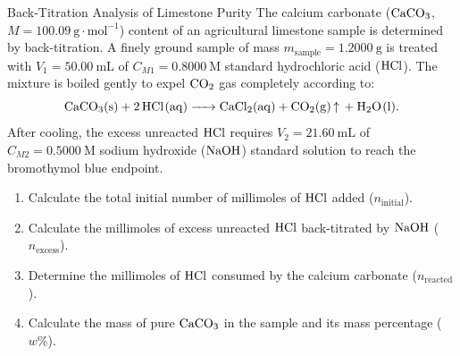 \begin{exercise}{Back-Titration Analysis of Limestone Purity}
The calcium carbonate ($\ce{CaCO3}$, $M = 100.09\ \mathrm{g\cdot mol^{-1}}$) content of an agricultural limestone sample is determined by back-titration. A finely ground sample of mass $m_{\text{sample}} = 1.2000\ \mathrm{g}$ is treated with $V_1 = 50.00\ \mathrm{mL}$ of $C_{M1} = 0.8000\ \mathrm{M}$ standard hydrochloric acid ($\ce{HCl}$). The mixture is boiled gently to expel $\ce{CO2}$ gas completely according to:
\[
\ce{CaCO3(s) + 2 HCl(aq) -> CaCl2(aq) + CO2(g) ^ + H2O(l)}.
\]
After cooling, the excess unreacted $\ce{HCl}$ requires $V_2 = 21.60\ \mathrm{mL}$ of $C_{M2} = 0.5000\ \mathrm{M}$ sodium hydroxide ($\ce{NaOH}$) standard solution to reach the bromothymol blue endpoint.
\begin{enumerate}[leftmargin=1.5em,itemsep=2pt]
  \item Calculate the total initial number of millimoles of $\ce{HCl}$ added ($n_{\text{initial}}$).
  \item Calculate the millimoles of excess unreacted $\ce{HCl}$ back-titrated by $\ce{NaOH}$ ($n_{\text{excess}}$).
  \item Determine the millimoles of $\ce{HCl}$ consumed by the calcium carbonate ($n_{\text{reacted}}$).
  \item Calculate the mass of pure $\ce{CaCO3}$ in the sample and its mass percentage ($w\%$).
\end{enumerate}
\end{exercise}

\begin{tabletworkspace}[5.0cm]
\end{tabletworkspace}

